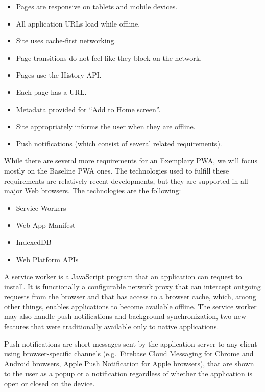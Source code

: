 \documentclass[english,odsaz]{fitthesis}
\begin{document}
\begin{itemize}
\item Pages are responsive on tablets and mobile devices.
\item All application URLs load while offline.
\item Site uses cache-first networking.
\item Page transitions do not feel like they block on the network.
\item Pages use the History API.
\item Each page has a URL.
\item Metadata provided for ``Add to Home screen''.
\item Site appropriately informs the user when they are offline.
\item Push notifications (which consist of several related requirements).
\end{itemize}

While there are several more requirements for an Exemplary PWA, we will focus
mostly on the Baseline PWA ones. The technologies used to fulfill these
requirements are relatively recent developments, but they are supported in all
major Web browsers. The technologies are the following:

\begin{itemize}
\item Service Workers
\item Web App Manifest
\item IndexedDB
\item Web Platform APIs
\end{itemize}

A service worker is a JavaScript program that an application can request to
install. It is functionally a configurable network proxy \cite{mdn_svcwrk} that can
intercept outgoing requests from the browser and that has access to a browser
cache, which, among other things, enables applications to become available
offline. The service worker may also handle push notifications and background
synchronization, two new features that were traditionally available only to
native applications.

Push notifications are short messages sent by the application server to any
client using browser-specific channels (e.g.~Firebase Cloud Messaging for
Chrome and Android browsers, Apple Push Notification for Apple browsers), that
are shown to the user as a popup or a notification regardless of whether the
application is open or closed on the device.
\end{document}
